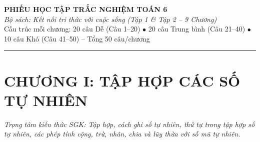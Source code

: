 \documentclass[11pt,a4paper]{article}
\begin{document}
\begin{center}
  {\LARGE\bfseries\color{primary} PHIẾU HỌC TẬP TRẮC NGHIỆM TOÁN 6}\\[4pt]
  {\normalsize\itshape\color{accent} Bộ sách: Kết nối tri thức với cuộc sống (Tập 1 \& Tập 2 – 9 Chương)}\\[4pt]
  {\small Cấu trúc mỗi chương: 20 câu Dễ (Câu 1--20) $\bullet$ 20 câu Trung bình (Câu 21--40) $\bullet$ 10 câu Khó (Câu 41--50) -- Tổng 50 câu/chương}
\end{center}
\vspace{6pt}\hrule\vspace{10pt}
\section*{\color{primary} CHƯƠNG I: TẬP HỢP CÁC SỐ TỰ NHIÊN}
\textit{Trọng tâm kiến thức SGK: Tập hợp, cách ghi số tự nhiên, thứ tự trong tập hợp số tự nhiên, các phép tính cộng, trừ, nhân, chia và lũy thừa với số mũ tự nhiên.}\par\vspace{4pt}
\end{document}
